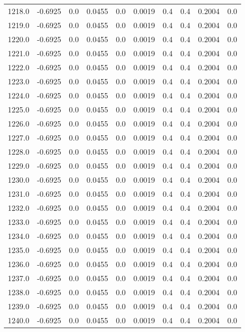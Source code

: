 \begin{longtable}{lrrrrrrrrr}
1218.0 & -0.6925 & 0.0 & 0.0455 & 0.0 & 0.0019 & 0.4 & 0.4 & 0.2004 & 0.0 \\
1219.0 & -0.6925 & 0.0 & 0.0455 & 0.0 & 0.0019 & 0.4 & 0.4 & 0.2004 & 0.0 \\
1220.0 & -0.6925 & 0.0 & 0.0455 & 0.0 & 0.0019 & 0.4 & 0.4 & 0.2004 & 0.0 \\
1221.0 & -0.6925 & 0.0 & 0.0455 & 0.0 & 0.0019 & 0.4 & 0.4 & 0.2004 & 0.0 \\
1222.0 & -0.6925 & 0.0 & 0.0455 & 0.0 & 0.0019 & 0.4 & 0.4 & 0.2004 & 0.0 \\
1223.0 & -0.6925 & 0.0 & 0.0455 & 0.0 & 0.0019 & 0.4 & 0.4 & 0.2004 & 0.0 \\
1224.0 & -0.6925 & 0.0 & 0.0455 & 0.0 & 0.0019 & 0.4 & 0.4 & 0.2004 & 0.0 \\
1225.0 & -0.6925 & 0.0 & 0.0455 & 0.0 & 0.0019 & 0.4 & 0.4 & 0.2004 & 0.0 \\
1226.0 & -0.6925 & 0.0 & 0.0455 & 0.0 & 0.0019 & 0.4 & 0.4 & 0.2004 & 0.0 \\
1227.0 & -0.6925 & 0.0 & 0.0455 & 0.0 & 0.0019 & 0.4 & 0.4 & 0.2004 & 0.0 \\
1228.0 & -0.6925 & 0.0 & 0.0455 & 0.0 & 0.0019 & 0.4 & 0.4 & 0.2004 & 0.0 \\
1229.0 & -0.6925 & 0.0 & 0.0455 & 0.0 & 0.0019 & 0.4 & 0.4 & 0.2004 & 0.0 \\
1230.0 & -0.6925 & 0.0 & 0.0455 & 0.0 & 0.0019 & 0.4 & 0.4 & 0.2004 & 0.0 \\
1231.0 & -0.6925 & 0.0 & 0.0455 & 0.0 & 0.0019 & 0.4 & 0.4 & 0.2004 & 0.0 \\
1232.0 & -0.6925 & 0.0 & 0.0455 & 0.0 & 0.0019 & 0.4 & 0.4 & 0.2004 & 0.0 \\
1233.0 & -0.6925 & 0.0 & 0.0455 & 0.0 & 0.0019 & 0.4 & 0.4 & 0.2004 & 0.0 \\
1234.0 & -0.6925 & 0.0 & 0.0455 & 0.0 & 0.0019 & 0.4 & 0.4 & 0.2004 & 0.0 \\
1235.0 & -0.6925 & 0.0 & 0.0455 & 0.0 & 0.0019 & 0.4 & 0.4 & 0.2004 & 0.0 \\
1236.0 & -0.6925 & 0.0 & 0.0455 & 0.0 & 0.0019 & 0.4 & 0.4 & 0.2004 & 0.0 \\
1237.0 & -0.6925 & 0.0 & 0.0455 & 0.0 & 0.0019 & 0.4 & 0.4 & 0.2004 & 0.0 \\
1238.0 & -0.6925 & 0.0 & 0.0455 & 0.0 & 0.0019 & 0.4 & 0.4 & 0.2004 & 0.0 \\
1239.0 & -0.6925 & 0.0 & 0.0455 & 0.0 & 0.0019 & 0.4 & 0.4 & 0.2004 & 0.0 \\
1240.0 & -0.6925 & 0.0 & 0.0455 & 0.0 & 0.0019 & 0.4 & 0.4 & 0.2004 & 0.0 \\

\end{longtable}
